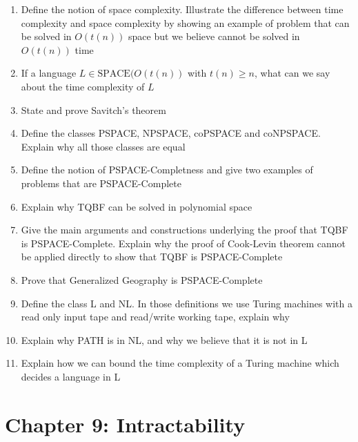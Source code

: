 \documentclass{article}
\begin{document}
\begin{enumerate}{}
\item Define the notion of space complexity. Illustrate the difference between time complexity and space complexity by showing an example of problem that can be solved in $O(t(n))$ space but we believe cannot be solved in $O(t(n))$ time

\item If a language $L \in \text{SPACE}(O(t(n))$ with $t(n) \geq n$, what can we say about
the time complexity of $L$

\item State and prove Savitch’s theorem

\item Define the classes PSPACE, NPSPACE, coPSPACE and coNPSPACE. Explain why all those classes are equal

\item Define the notion of PSPACE-Completness and give two examples of problems that are PSPACE-Complete

\item Explain why TQBF can be solved in polynomial space

\item Give the main arguments and constructions underlying the proof that TQBF is PSPACE-Complete. Explain why the proof of Cook-Levin theorem cannot be applied directly to show that TQBF is PSPACE-Complete

\item Prove that Generalized Geography is PSPACE-Complete

\item Define the class L and NL. In those definitions we use Turing machines with a read only input tape and read/write working tape, explain why

\item Explain why PATH is in NL, and why we believe that it is not in L

\item Explain how we can bound the time complexity of a Turing machine which decides a language in L

\end{enumerate}

\clearpage
\section{Chapter 9: Intractability}
\end{document}
